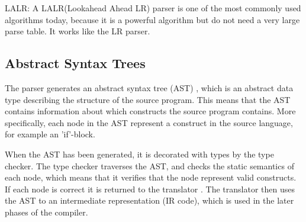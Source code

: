LALR:
A LALR(Lookahead Ahead LR) parser is one of the most commonly used algorithms today, because it is a powerful algorithm but do not need a very large parse table. It works like the LR parser.

\subsection*{Abstract Syntax Trees}
The parser generates an abstract syntax tree (AST) \citep{CraftingACompiler}, which is an abstract data type describing the structure of the source program. This means that the AST contains information about which constructs the source program contains. More specifically, each node in the AST represent a construct in the source language, for example an 'if'-block.

When the AST has been generated, it is decorated with types by the type checker. The type checker traverses the AST, and checks the static semantics of each node, which means that it verifies that the node represent valid constructs. If each node is correct it is returned to the translator \citep{CraftingACompiler}. The translator then uses the AST to an intermediate representation (IR code), which is used in the later phases of the compiler.